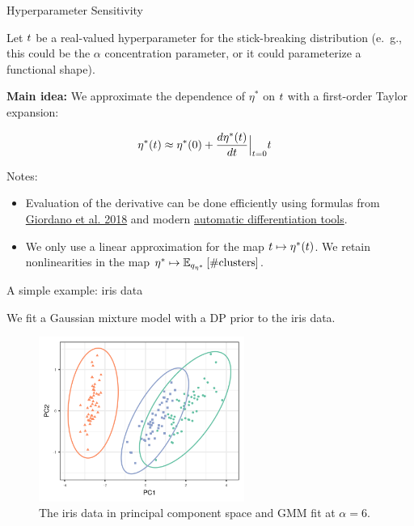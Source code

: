 \begin{frame}{Hyperparameter Sensitivity}

Let $t$ be a real-valued hyperparameter for the stick-breaking distribution
(e.\ g., this could be the $\alpha$ concentration parameter, or it could parameterize a functional shape).

\pause

{\bf Main idea: } We approximate the dependence of $\eta^*$ on $t$ with a first-order
Taylor expansion:

\begin{align*}
  \eta^*(t)  &\approx  \eta^*(0) +
  \frac{d \eta^*(t)}{dt}\Big|_{t=0} t
\end{align*}

\pause

Notes:
\begin{itemize}
\item Evaluation of the derivative can be done efficiently using formulas from
{\color{blue} \href{https://arxiv.org/abs/1709.02536}{Giordano et al. 2018}}
and modern
{\color{blue} \href{https://jax.readthedocs.io/en/latest/}{automatic differentiation tools}}.

\item We only use a linear approximation for the map $t \mapsto \eta^*(t)$. We retain nonlinearities in the map $\eta^* \mapsto
\mathbb{E}_{q_{\eta^*}} \left[ \#\text{clusters} \right]$.

\end{itemize}
\end{frame}

\begin{frame}{A simple example: iris data}

We fit a Gaussian mixture model with a DP prior to
the iris data.

\begin{figure}[!h]
  \centering
  \includegraphics[width = 0.6\textwidth]{./figures/iris_init_fit.png}
  \caption*{The iris data in principal component space and GMM fit at $\alpha = 6$.}
\end{figure}

\end{frame}

